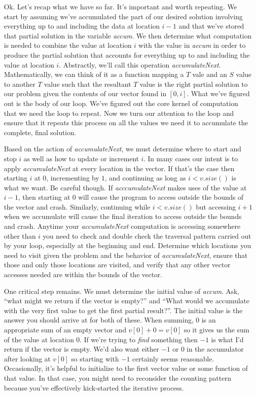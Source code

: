 \documentclass[]{tufte-handout}
\begin{document}
Ok. Let's recap what we have so far. It's important and worth repeating. We start by assuming we've accumulated the part of our desired solution involving everything up to and including the data at location $i-1$ and that we've stored that partial solution in the variable \textit{accum}.  We then determine what computation is needed to combine the value at location $i$ with the value in \textit{accum} in order to produce the partial solution that accounts for everything up to and including the value at location $i$. Abstractly, we'll call this operation \textit{accumulateNext}. Mathematically, we can think of it as a function mapping a $T$ vale and an $S$ value to another $T$ value such that the resultant $T$ value is the right partial solution to our problem given the contents of our vector found in $[0,i]$. What we've figured out is the body of our loop. We've figured out the core kernel of computation that we need the loop to repeat. Now we turn our attention to the loop and ensure that it repeats this process on all the values we need it to accumulate the complete, final solution. 

Based on the action of \textit{accumulateNext}, we must determine where to  start and stop $i$ as well as how to update or increment $i$.  In many cases our intent is to apply \textit{accumulateNext} at every location in the vector. If that's the case then starting $i$ at 0, incrementing by $1$, and continuing as long as $i < v.size()$ is what we want. Be careful though.  If \textit{acccumulateNext} makes uses of the value at $i-1$, then starting at 0 will cause the program to access outside the bounds of the vector and crash.  Similarly, continuing while $i < v.size()$ but accessing $i+1$ when we accumulate will cause the final iteration to access outside the bounds and crash. Anytime your \textit{accumulateNext} computation is accessing somewhere other than $i$ you need to check and double check the traversal pattern carried out by your loop, especially at the beginning and end. Determine which locations you need to visit given the problem and the behavior of \textit{accumulateNext}, ensure that those and only those locations are visited,  and verify that any other vector accesses needed are within the bounds of the vector.

One critical step remains. We must determine the initial value of \textit{accum}. Ask, ``what might we return if the vector is empty?'' and ``What would we accumulate with the very first value to get the first partial result?''.  The initial value is the answer you should arrive at for both of these.  When summing, $0$ is an appropriate sum of an empty vector and $v[0]+0 = v[0]$ so it gives us the sum of the value at location $0$. If we're trying to \textit{find}  something then $-1$ is what I'd return if the vector is empty. We'd also want either $-1$ or $0$ in the accumulator after looking at $v[0]$ so starting with $-1$ certainly seems reasonable.  Occasionally, it's helpful to initialize to the first vector value or some function of that value. In that case, you might need to reconsider the counting pattern because you've effectively kick-started the iterative process.
\end{document}
